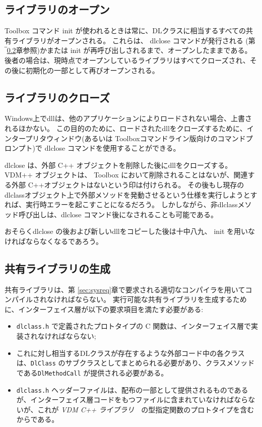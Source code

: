\documentclass[\pformat,12pt]{jarticle}
\newcommand{\vdmcpplib}{\textit{VDM C++ ライブラリ}}
\begin{document}
\subsection{ライブラリのオープン}

Toolbox コマンド \textsf{init} が使われるときは常に、DLクラスに相当するすべての共有ライブラリがオープンされる。
これらは、 \textsf{dlclose} コマンドが発行される (第‾\ref{sec:dlclose}章参照)かまたは \textsf{init} が再呼び出しされるまで、オープンしたままである。
後者の場合は、現時点でオープンしているライブラリはすべてクローズされ、その後に初期化の一部として再びオープンされる。

\subsection{ライブラリのクローズ}\label{sec:dlclose}

Windows上でdllは、他のアプリケーションによりロードされない場合、上書されるほかない。
この目的のために、ロードされたdllをクローズするために、インタープリタウィンドウ(あるいは Toolboxコマンドライン版向けのコマンドプロンプト)で \textsf{dlclose} コマンドを使用することができる。

\textsf{dlclose} は、外部 C++ オブジェクトを削除した後にdllをクローズする。
 VDM++ オブジェクトは、 Toolbox において削除されることはないが、関連する外部 C++オブジェクトはないという印は付けられる。 
その後もし現存のdlclassオブジェクト上で外部メソッドを発動させるという仕様を実行しようとすれば、実行時エラーを起こすことになるだろう。
しかしながら、非dlclassメソッド呼び出しは、\textsf{dlclose} コマンド後になされることも可能である。

おそらく\textsf{dlclose} の後および新しいdllをコピーした後は十中八九、 \textsf{init} を用いなければならなくなるであろう。



\subsection{共有ライブラリの生成}\label{sec:create}

共有ライブラリは、第 \ref{sec:sysreq}章で要求される適切なコンパイラを用いてコンパイルされなければならない。
実行可能な共有ライブラリを生成するために、インターフェイス層が以下の要求項目を満たす必要がある:
\begin{itemize}
\item \texttt{dlclass.h} で定義されたプロトタイプの C 関数は、インターフェイス層で実装されなければならない;
\item これに対し相当するDLクラスが存在するような外部コード中の各クラスは、\texttt{DlClass} のサブクラスとしてまとめられる必要があり、クラスメソッドである\texttt{DlMethodCall} が提供される必要がある。
\item {\tt dlclass.h} ヘッダーファイルは、配布の一部として提供されるものであるが、インターフェイス層コードをもつファイルに含まれていなければならないが、これが \vdmcpplib　の型指定関数のプロトタイプを含むからである。
\end{itemize}
\end{document}
